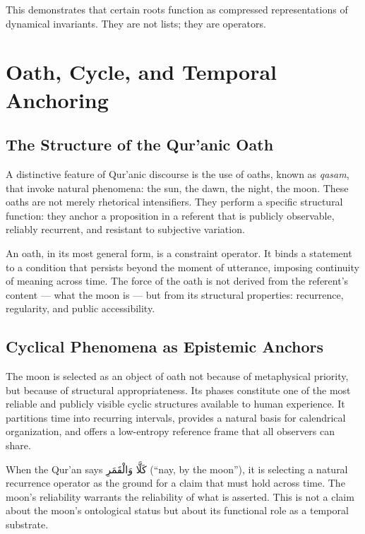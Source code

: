\documentclass[12pt, oneside]{article}
\newcommand{\AR}[1]{\textarabic{#1}}
\theoremstyle{definition}
\theoremstyle{remark}
\begin{document}
This demonstrates that certain roots function as compressed representations of dynamical invariants.
They are not lists; they are operators.

\section{Oath, Cycle, and Temporal Anchoring}

\subsection{The Structure of the Qur'anic Oath}

A distinctive feature of Qur'anic discourse is the use of oaths, known as \emph{qasam}, that invoke natural phenomena: the sun, the dawn, the night, the moon.
These oaths are not merely rhetorical intensifiers.
They perform a specific structural function: they anchor a proposition in a referent that is publicly observable, reliably recurrent, and resistant to subjective variation.

An oath, in its most general form, is a constraint operator.
It binds a statement to a condition that persists beyond the moment of utterance, imposing continuity of meaning across time.
The force of the oath is not derived from the referent's content --- what the moon is --- but from its structural properties: recurrence, regularity, and public accessibility.

\subsection{Cyclical Phenomena as Epistemic Anchors}

The moon is selected as an object of oath not because of metaphysical priority, but because of structural appropriateness.
Its phases constitute one of the most reliable and publicly visible cyclic structures available to human experience.
It partitions time into recurring intervals, provides a natural basis for calendrical organization, and offers a low-entropy reference frame that all observers can share.

When the Qur'an says \AR{كَلَّا وَالْقَمَرِ} (``nay, by the moon''), it is selecting a natural recurrence operator as the ground for a claim that must hold across time.
The moon's reliability warrants the reliability of what is asserted.
This is not a claim about the moon's ontological status but about its functional role as a temporal substrate.
\end{document}
